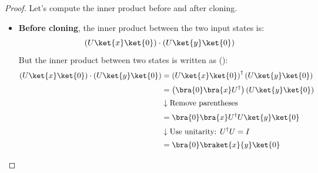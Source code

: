 \begin{deepeningbox}
\begin{proof}
        \highspace
        Let's compute the inner product before and after cloning.
        \begin{itemize}
            \item \textbf{Before cloning}, the inner product between the two input states is:
            \begin{equation*}
                \left(U\ket{x}\ket{0}\right) \cdot \left(U\ket{y}\ket{0}\right)
            \end{equation*}
            But the inner product between two states is written as ():
            \begin{align*}
                \left(U\ket{x}\ket{0}\right) \cdot \left(U\ket{y}\ket{0}\right) &= \left(U\ket{x}\ket{0}\right)^{\dagger} \left(U\ket{y}\ket{0}\right) \\[.2em]
                &=
                \left(\bra{0}\bra{x}U^\dagger\right)\left(U\ket{y}\ket{0}\right) \\[.2em]
                &\downarrow \text{Remove parentheses} \\[.2em]
                &=
                \bra{0}\bra{x}U^\dagger U\ket{y}\ket{0} \\[.2em]
                &\downarrow \text{Use unitarity: } U^\dagger U = I \\[.2em]
                &=
                \bra{0}\braket{x}{y}\ket{0}
            \end{align*}


\end{itemize}
\end{proof}
\end{deepeningbox}
